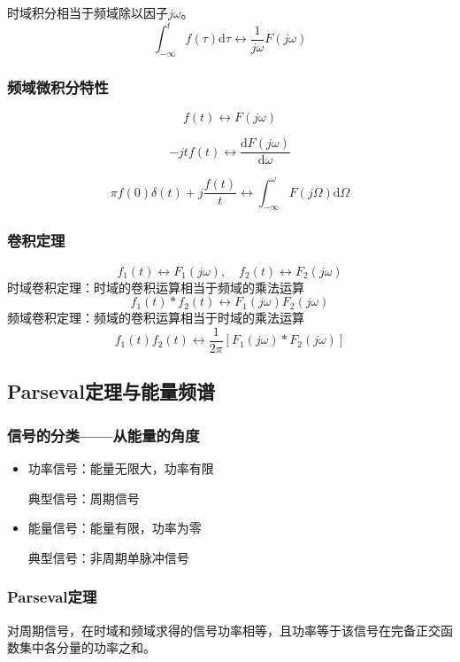 \documentclass[UTF8]{ctexart}
\begin{document}
时域积分相当于频域除以因子$jω$。
$$
\int_{-\infty}^tf(\tau)\mathrm{d}\tau \leftrightarrow \frac{1}{j\omega}F(j\omega)
$$

\subsubsection{频域微积分特性}

$$
f(t) \leftrightarrow F(j\omega)
$$

$$
-jtf(t) \leftrightarrow \frac{\mathrm{d}F(j\omega)}{\mathrm{d}\omega}
$$

$$
\pi f(0)\delta(t) + j\frac{f(t)}{t} \leftrightarrow \int_{-\infty}^{\omega} F(j\Omega)\mathrm{d}\Omega
$$

\subsubsection{卷积定理}

$$
f_1(t) \leftrightarrow F_1(j\omega),\quad f_2(t) \leftrightarrow F_2(j\omega)
$$
时域卷积定理：时域的卷积运算相当于频域的乘法运算
$$
f_1(t) * f_2(t) \leftrightarrow F_1(j\omega)F_2(j\omega)
$$
频域卷积定理：频域的卷积运算相当于时域的乘法运算
$$
f_1(t)f_2(t) \leftrightarrow \frac{1}{2\pi}\left[F_1(j\omega)*F_2(j\omega)\right]
$$

\subsection{Parseval定理与能量频谱}

\subsubsection{信号的分类——从能量的角度}

\begin{itemize}
    \item 功率信号：能量无限大，功率有限
    
    典型信号：周期信号
    
    \item 能量信号：能量有限，功率为零
    
    典型信号：非周期单脉冲信号
\end{itemize}

\subsubsection{Parseval定理}

对周期信号，在时域和频域求得的信号功率相等，且功率等于该信号在完备正交函数集中各分量的功率之和。
\end{document}
